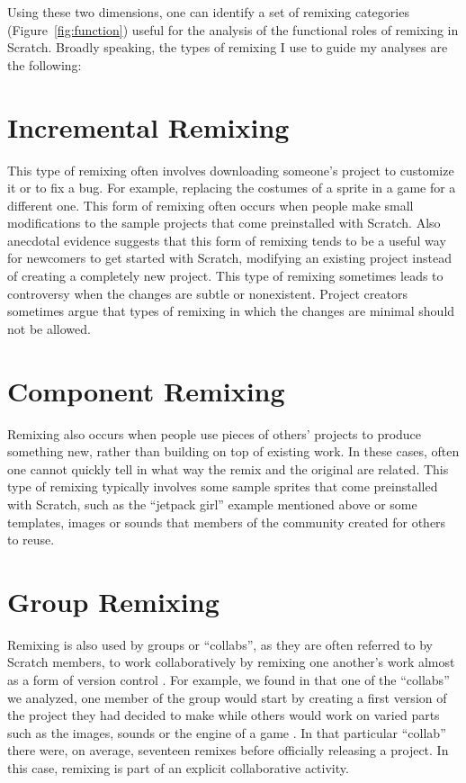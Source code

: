 Using these two dimensions, one can identify a set of remixing categories (Figure~\ref{fig:function}) useful for the analysis of the functional roles of remixing in Scratch.
Broadly speaking, the types of remixing I  use to guide my analyses are the following:

\section{Incremental Remixing}
This type of remixing often involves downloading someone's project to customize it or to fix a bug. 
For example, replacing the costumes of a sprite in a game for a different one. 
This form of remixing often occurs when people make small modifications to the sample projects that come preinstalled with Scratch.
Also anecdotal evidence suggests that this form of remixing tends to be a useful way for newcomers to get started with Scratch,  modifying an existing project instead of creating a completely new project.
This type of remixing sometimes leads to controversy when the changes are subtle or nonexistent.
Project creators sometimes argue that types of remixing in which the changes are minimal should not be allowed.

\section{Component Remixing}
Remixing also occurs when people use pieces of others' projects to produce something new, rather than building on top of existing work.   
In these cases, often one cannot quickly tell in what way the remix and the original are related.
This type of remixing typically involves some sample sprites that come preinstalled with Scratch, such as the ``jetpack girl'' example mentioned above or some templates, images or sounds that members of the community created for others to reuse.


\section{Group Remixing}
Remixing is also used by groups or ``collabs'', as they are often referred to by Scratch members, to work collaboratively by remixing one another's work almost as a form of version control \citep{tichy_rcs_1985}.
For example, we found in that one of the ``collabs'' we analyzed, one member of the group would start by creating a first version of the project they had decided to make while others would work on varied parts such as the images, sounds or the engine of a game \citep{aragon_tale_2009}.
In that particular ``collab'' there were, on average, seventeen remixes before officially releasing a project.
In this case, remixing is part of an explicit collaborative activity.


